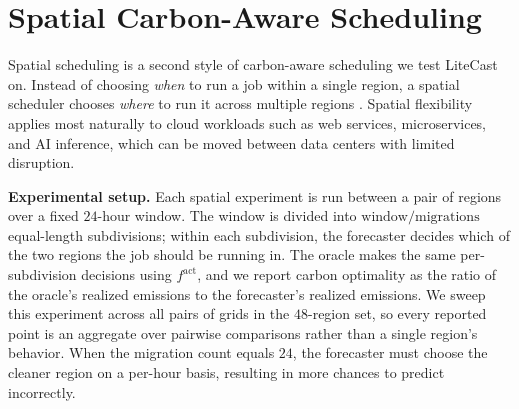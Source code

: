 
\section{Spatial Carbon-Aware Scheduling}
\label{sec:eval-spatial}

Spatial scheduling is a second style of carbon-aware scheduling we test LiteCast on.
Instead of choosing \textit{when} to run a job within a single region, a spatial scheduler chooses \textit{where} to run it across multiple regions \cite{souza_casper_2023, gsteiger_caribou_2024}.
Spatial flexibility applies most naturally to cloud workloads such as web services, microservices, and AI inference, which can be moved between data centers with limited disruption.

\textbf{Experimental setup.}
Each spatial experiment is run between a pair of regions over a fixed $24$-hour window.
The window is divided into $\text{window}/\text{migrations}$ equal-length subdivisions; within each subdivision, the forecaster decides which of the two regions the job should be running in.
The oracle makes the same per-subdivision decisions using $f^{\text{act}}$, and we report carbon optimality as the ratio of the oracle's realized emissions to the forecaster's realized emissions.
We sweep this experiment across all pairs of grids in the $48$-region set, so every reported point is an aggregate over pairwise comparisons rather than a single region's behavior.
When the migration count equals $24$, the forecaster must choose the cleaner region on a per-hour basis, resulting in more chances to predict incorrectly.

